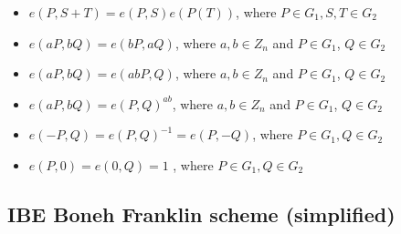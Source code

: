 \begin{itemize}
    \item $e(P, S+T) = e(P,S) e(P(T))$, where $P \in G_1, S,T \in G_2$
    \item $e(aP, bQ) = e(bP, aQ)$,  where $a,b \in Z_n$ and $P \in G_1$, $Q \in G_2$
    \item $e(aP, bQ) = e(abP,Q)$,  where $a,b \in Z_n$ and $P \in G_1$, $Q \in G_2$
    \item $e(aP, bQ) = e(P,Q)^{ab}$,  where $a,b \in Z_n$ and $P \in G_1$, $Q \in G_2$
    \item $e(-P, Q) = e(P,Q)^{-1} = e(P,-Q)$, where $P \in G_1, Q \in G_2$
    \item $e(P,0) = e(0, Q) = 1$ , where $P \in G_1, Q \in G_2$
    \end{itemize}

\subsection{IBE Boneh Franklin scheme (simplified)}


